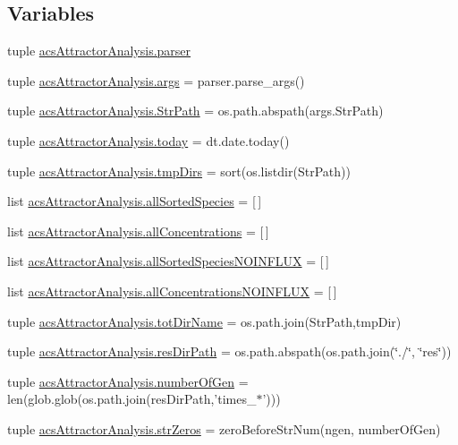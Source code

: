 \subsection*{Variables}
\begin{DoxyCompactItemize}
\item 
tuple \hyperlink{a00124_ab2b01a2d0224ace0cd720a6d807afd0b}{acs\+Attractor\+Analysis.\+parser}
\item 
tuple \hyperlink{a00124_a750e66218ca39f0949f2f92e89136e37}{acs\+Attractor\+Analysis.\+args} = parser.\+parse\+\_\+args()
\item 
tuple \hyperlink{a00124_a8941499f40259763765b64e3185be82c}{acs\+Attractor\+Analysis.\+Str\+Path} = os.\+path.\+abspath(args.\+Str\+Path)
\item 
tuple \hyperlink{a00124_a71bc5e3d205016fb7893b438e75be78e}{acs\+Attractor\+Analysis.\+today} = dt.\+date.\+today()
\item 
tuple \hyperlink{a00124_ac88c3245a42ebefee3fcf90626f6eaf4}{acs\+Attractor\+Analysis.\+tmp\+Dirs} = sort(os.\+listdir(Str\+Path))
\item 
list \hyperlink{a00124_aafc595063b7c4b74f94c0931ff2370a5}{acs\+Attractor\+Analysis.\+all\+Sorted\+Species} = \mbox{[}$\,$\mbox{]}
\item 
list \hyperlink{a00124_ae708f0b0e671f432735f039e1ff6b6ca}{acs\+Attractor\+Analysis.\+all\+Concentrations} = \mbox{[}$\,$\mbox{]}
\item 
list \hyperlink{a00124_a02a8db664a67956bc698b79f7c31a7bd}{acs\+Attractor\+Analysis.\+all\+Sorted\+Species\+N\+O\+I\+N\+F\+L\+U\+X} = \mbox{[}$\,$\mbox{]}
\item 
list \hyperlink{a00124_acda16f4751633455ab19e92bdc5baf2a}{acs\+Attractor\+Analysis.\+all\+Concentrations\+N\+O\+I\+N\+F\+L\+U\+X} = \mbox{[}$\,$\mbox{]}
\item 
tuple \hyperlink{a00124_ad3caf9c42727aaab24f4ea4dae362fc9}{acs\+Attractor\+Analysis.\+tot\+Dir\+Name} = os.\+path.\+join(Str\+Path,tmp\+Dir)
\item 
tuple \hyperlink{a00124_a35eb3b681c7408f1476b92798d4f2c16}{acs\+Attractor\+Analysis.\+res\+Dir\+Path} = os.\+path.\+abspath(os.\+path.\+join(\char`\"{}./\char`\"{}, \char`\"{}res\char`\"{}))
\item 
tuple \hyperlink{a00124_ac014a9b46a060e4fed96eaee9614345b}{acs\+Attractor\+Analysis.\+number\+Of\+Gen} = len(glob.\+glob(os.\+path.\+join(res\+Dir\+Path,'times\+\_\+$\ast$')))
\item 
tuple \hyperlink{a00124_a5708d1d44920d75a918ec1c988c02c57}{acs\+Attractor\+Analysis.\+str\+Zeros} = zero\+Before\+Str\+Num(ngen, number\+Of\+Gen)

\end{DoxyCompactItemize}
